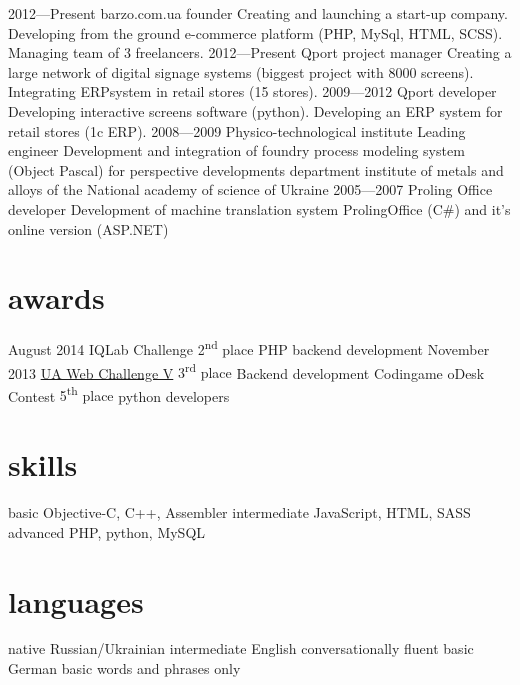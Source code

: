 \documentclass[hidelinks,a4paper]{cv}
\begin{document}
\begin{entrylist}
  \entry
    {2012—Present}
    {barzo.com.ua}
    {founder}
    {Creating and launching a start-up company. Developing from the ground e-commerce platform (PHP, MySql, HTML, SCSS). Managing team of 3 freelancers.
    }
  \entry
    {2012—Present}
    {Qport}
    {project manager}
    {
    Creating a large network of digital signage systems (biggest project with 8000 screens).
    Integrating ERPsystem in retail stores (15 stores).
    }
  \entry
    {2009—2012}
    {Qport}
    {developer}
    {
    Developing interactive screens software (python). 
    Developing an ERP system for retail stores (1c ERP).
    }
  \entry
    {2008—2009} 
    {Physico-technological institute}
    {Leading engineer}
    {Development and integration of foundry process modeling system (Object Pascal) for perspective developments department institute of metals and alloys of the National academy of science of Ukraine}
  \entry
    {2005—2007}
    {Proling Office}
    {developer}
    {Development of machine translation system ProlingOffice (C\#) and it's online version (ASP.NET)}
\end{entrylist}

\section{awards}

\begin{entrylist}
  \entry
   {August 2014}
   {IQLab Challenge}
   {2\textsuperscript{nd} place}
   {PHP backend development}
  \entry  
   {November 2013}
   {\href{http://uawebchallenge.com/news/v-final-results}{UA Web Challenge V}}
   {3\textsuperscript{rd} place}
   {Backend development}
  \entry  
   {}
   {Codingame oDesk Contest}
   {5\textsuperscript{th} place}
   {python developers }
\end{entrylist}

\newpage{}

\section{skills}
\begin{entrylist}
  \entry
   {basic}
   {Objective-C, C++, Assembler}
   {}
   {}
  \entry
   {intermediate}
   {JavaScript, HTML, SASS}
   {}
   {}
  \entry
   {advanced}
   {PHP, python, MySQL}
   {}
   {}
\end{entrylist}

\section{languages}
\begin{entrylist}
  \entry
   {native}
   {Russian/Ukrainian}
   {}
   {}
  \entry
   {intermediate}
   {English}
   {conversationally fluent}
   {}
  \entry
   {basic}
   {German}
   {basic words and phrases only}
   {}
\end{entrylist}
\end{document}

